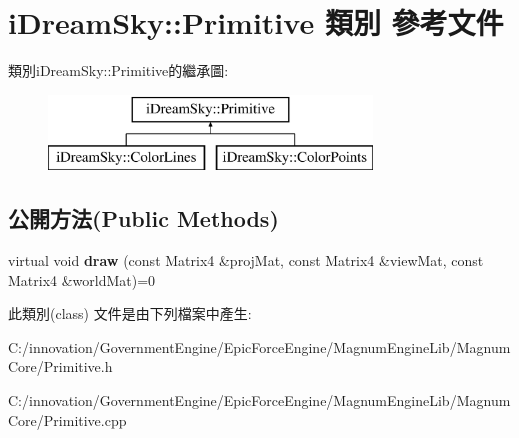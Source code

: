 \hypertarget{classi_dream_sky_1_1_primitive}{}\section{i\+Dream\+Sky\+:\+:Primitive 類別 參考文件}
\label{classi_dream_sky_1_1_primitive}
類別i\+Dream\+Sky\+:\+:Primitive的繼承圖\+:\begin{figure}[H]
\begin{center}
\leavevmode
\includegraphics[height=2.000000cm]{classi_dream_sky_1_1_primitive}
\end{center}
\end{figure}
\subsection*{公開方法(Public Methods)}
\begin{DoxyCompactItemize}
\item 
virtual void {\bfseries draw} (const Matrix4 \&proj\+Mat, const Matrix4 \&view\+Mat, const Matrix4 \&world\+Mat)=0\hypertarget{classi_dream_sky_1_1_primitive_adcbc050f98a0fa6e39dfbbba5e946868}{}\label{classi_dream_sky_1_1_primitive_adcbc050f98a0fa6e39dfbbba5e946868}

\end{DoxyCompactItemize}


此類別(class) 文件是由下列檔案中產生\+:\begin{DoxyCompactItemize}
\item 
C\+:/innovation/\+Government\+Engine/\+Epic\+Force\+Engine/\+Magnum\+Engine\+Lib/\+Magnum\+Core/Primitive.\+h\item 
C\+:/innovation/\+Government\+Engine/\+Epic\+Force\+Engine/\+Magnum\+Engine\+Lib/\+Magnum\+Core/Primitive.\+cpp\end{DoxyCompactItemize}
